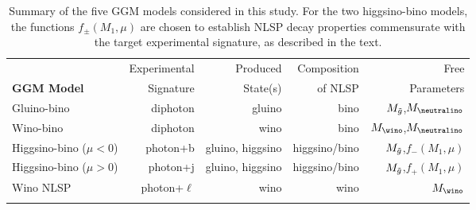 \begin{table}[bp]
  \caption{Summary of the five GGM models considered in this study. For the two higgsino-bino
models, the functions $f_{\pm}(M_1,\mu)$ are chosen to establish NLSP decay properties
commensurate with the target experimental signature, as described in the text.}
  \begin{center}
  \begin{tabular*}{\textwidth}{@{\extracolsep{\fill}}lrrrr} \hline
                            & Experimental       & Produced        & Composition    &  Free                \\
    {\bf GGM Model}         & Signature          & State(s)        & of NLSP        &  Parameters          \\
      \noalign{\smallskip}\hline\noalign{\smallskip}
    Gluino-bino             & diphoton           & gluino           & bino          & $M_{\tilde{g}}$,$M_{\neutralino}$ \\
    Wino-bino               & diphoton           & wino             & bino          & $M_{\wino}$,$M_{\neutralino}$   \\
    Higgsino-bino ($\mu<0$) & photon+b           & gluino, higgsino & higgsino/bino & $M_{\tilde{g}}$,$f_{-}(M_1,\mu)$          \\
    Higgsino-bino ($\mu>0$) & photon+j           & gluino, higgsino & higgsino/bino & $M_{\tilde{g}}$,$f_{+}(M_1,\mu)$          \\
    Wino NLSP               & photon+$\ell$      & wino             & wino          & $M_{\wino}$          \\
      \noalign{\smallskip}\hline\noalign{\smallskip}
  \end{tabular*}
  \label{tab:GGM_models}
  \end{center}
\end{table}


